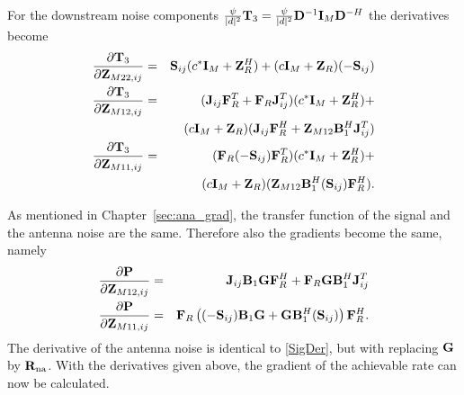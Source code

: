 For the downstream noise components $\frac{\psi}{|d|^2}\mathbf{T}_3=\frac{\psi}{|d|^2}\mathbf{D}^{-1}\mathbf{I}_M\mathbf{D}^{{-H}}$ the derivatives become
\begin{eqnarray}
\frac{\partial \mathbf{T}_3}{\partial \mathbf{Z}_{M22,ij}}&=&\mathbf{S}_{ij}(c^*\mathbf{I}_M+\mathbf{Z}_{R}^H)+ 
(c\mathbf{I}_M+\mathbf{Z}_{R})(-\mathbf{S}_{ij}) \nonumber\\
\frac{\partial \mathbf{T}_3}{\partial \mathbf{Z}_{M12,ij}}&=&(\mathbf{J}_{ij}\mathbf{F}_R^T+\mathbf{F}_R\mathbf{J}_{ij}^T)
(c^*\mathbf{I}_M+\mathbf{Z}_R^H)+ \nonumber \\
 && (c\mathbf{I}_M+\mathbf{Z}_R) 
(\mathbf{J}_{ij}\mathbf{F}_R^H+\mathbf{Z}_{M12}\mathbf{B}_1^H\mathbf{J}_{ij}^T)  \nonumber \\
\frac{\partial \mathbf{T}_3}{\partial \mathbf{Z}_{M11,ij}}&=& (\mathbf{F}_R(-\mathbf{S}_{ij})\mathbf{F}_R^T)(c^*\mathbf{I}_M+\mathbf{Z}_R^H)+   \nonumber \\
&&  (c\mathbf{I}_M+\mathbf{Z}_R)(\mathbf{Z}_{M12}\mathbf{B}_1^H(\mathbf{S}_{ij})\mathbf{F}_R^H).
\label{ShortenedPostLNA}
\end{eqnarray}

As mentioned in Chapter~\ref{sec:ana_grad}, the transfer function of the signal and the antenna noise are the same.
Therefore also the gradients become the same, namely
\begin{eqnarray}
\frac{\partial \mathbf{P}}{\partial \mathbf{Z}_{M12,ij}}&=&\mathbf{J}_{ij}\mathbf{B}_1\mathbf{G} \mathbf{F}_R^H+ 
 \mathbf{F}_R\mathbf{G} \mathbf{B}_1^H\mathbf{J}_{ij}^T \nonumber\\
\frac{\partial \mathbf{P}}{\partial \mathbf{Z}_{M11,ij}}&=&\mathbf{F}_R\left((-\mathbf{S}_{ij})\mathbf{B}_1\mathbf{G} + \mathbf{G}\mathbf{B}_1^H(\mathbf{S}_{ij}) \right)\mathbf{F}_R^H.
\label{SigDer}
\end{eqnarray}
The derivative of the antenna noise is identical to \eqref{SigDer}, but with replacing $\mathbf{G}$ by $\mathbf{R}_{\text{na}}$. With the derivatives given above, the gradient of the achievable rate can now be calculated.




